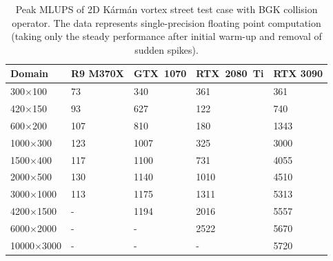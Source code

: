 \begin{table}[!ht]
	\centering
	\begin{tabular}{ |p{3cm}||p{2.2cm}|p{2.2cm}|p{2.4cm}|p{2.2cm}|  }
		\hline
		Domain & R9 M370X & GTX~1070 & RTX~2080~Ti & RTX 3090 \\
		\hline
		300$\times$100   & 73 & 340 & 361    & 361  \\
		420$\times$150   & 93 & 627 & 122    & 740  \\
		600$\times$200   & 107 & 810 & 180    & 1343  \\
		1000$\times$300   & 123 & 1007 & 325    & 3000  \\
		1500$\times$400   & 117 & 1100 & 731    & 4055  \\
		2000$\times$500   & 130 & 1140 & 1010    & 4510  \\
		3000$\times$1000   & 113 & 1175 & 1311    & 5313  \\
		4200$\times$1500   & - & 1194 & 2016    & 5557  \\
		6000$\times$2000   & - & - & 2522  & 5670  \\
		10000$\times$3000   & - & - & -   & 5720  \\
		\hline
	\end{tabular}
	\caption{Peak MLUPS of 2D Kármán vortex street test case with BGK collision operator. The data represents single-precision floating point computation (taking only the steady performance after initial warm-up and removal of sudden spikes).}
	\label{tab:channel-mlups}
\end{table}


